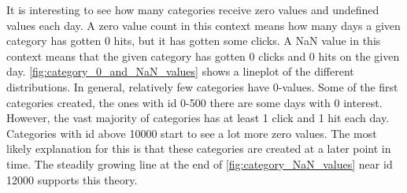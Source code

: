 It is interesting to see how many categories receive zero values and undefined values each day.
A zero value count in this context means how many days a given category has gotten 0 hits, but it has gotten some clicks.
A NaN value in this context means that the given category has gotten 0 clicks and 0 hits on the given day.
\autoref{fig:category_0_and_NaN_values} shows a lineplot of the different distributions.
In general, relatively few categories have 0-values. 
Some of the first categories created, the ones with id 0-500 there are some days with 0 interest.
However, the vast majority of categories has at least 1 click and 1 hit each day.
Categories with id above 10000 start to see a lot more zero values.
The most likely explanation for this is that these categories are created at a later point in time.
The steadily growing line at the end of \autoref{fig:category_NaN_values} near id 12000 supports this theory.
